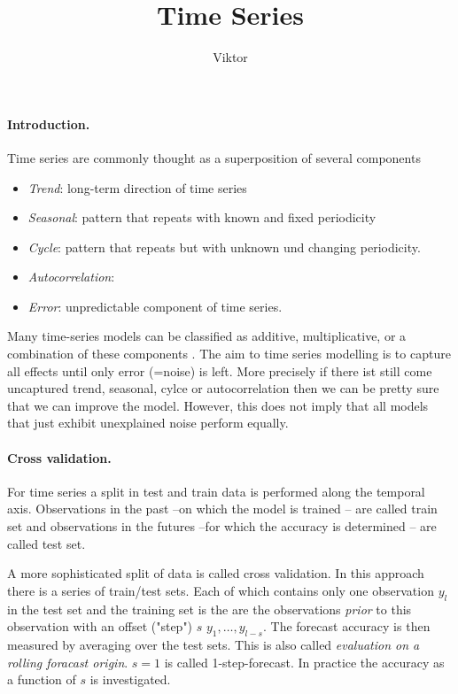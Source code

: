 \documentclass[12pt,a4paper]{article}
\begin{document}

\title{Time Series}
\author{Viktor}
\maketitle
\paragraph{Introduction.}
Time series are commonly thought as a superposition of several components
\begin{itemize}
	\item \textit{Trend}: long-term direction of time series
	\item \textit{Seasonal}: pattern that repeats with known and fixed periodicity 
	\item \textit{Cycle}: pattern that repeats but with unknown und changing periodicity.
	\item \textit{Autocorrelation}:
	\item \textit{Error}: unpredictable component of time series.
\end{itemize}

Many time-series models can be classified as additive, multiplicative, or a combination of these components \cite{hyndman_forecasting_with_exponential_smoothing}. The aim to time series modelling is to capture all effects until only error (=noise) is left. More precisely if there ist still come uncaptured trend, seasonal, cylce or autocorrelation then we can be pretty sure that we can improve the model. However, this does not imply that all models that just exhibit unexplained noise perform equally.  
 
\paragraph{Cross validation.} For time series a split in test and train data is performed along the temporal axis. Observations in the past --on which the model is trained -- are called train set and observations in the futures --for which the accuracy is determined --  are called test set. 

A more sophisticated split of data is called cross validation. In this approach there is a series of train/test sets. Each of which contains only one observation $y_l$ in the test set and the training set is the are the observations \textit{prior} to this observation with an offset ("step") $s$ ${y_1, \dots, y_{l-s}}$.	The forecast accuracy is then measured by averaging over the test sets. This is also called \textit{evaluation on a rolling foracast origin}. $s=1$ is called 1-step-forecast. In practice the accuracy as a function of $s$ is investigated.
\end{document}
